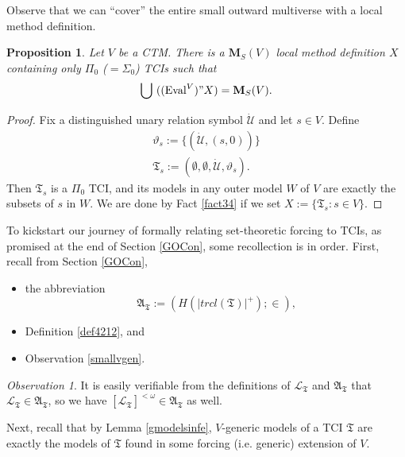 \documentclass[12pt, twoside]{memoir}
\numberwithin{equation}{section}
\newtheorem{prop}[thm]{Proposition}
\theoremstyle{definition}
\theoremstyle{remark}
\newtheorem{ob}[thm]{Observation}
\theoremstyle{definition}
\theoremstyle{definition}
\theoremstyle{definition}
\theoremstyle{remark}
\begin{document}
Observe that we can ``cover'' the entire small outward multiverse with a local method definition.

\begin{prop}\label{prop326}
Let $V$ be a CTM. There is a $\mathbf{M}_S(V)$ local method definition $X$ containing only $\Pi_0$ ($= \Sigma_0$) TCIs such that 
\begin{equation*}
    \bigcup \ ((\mathrm{Eval}^V)" X) = \mathbf{M}_S(V) \text{.}
\end{equation*}
\end{prop}

\begin{proof}
Fix a distinguished unary relation symbol $\dot{\mathcal{U}}$ and let $s \in V$. Define 
\begin{gather*}
    \vartheta_s := \{(\dot{\mathcal{U}}, (s, 0))\} \\
    \mathfrak{T}_s := (\emptyset, \emptyset, \dot{\mathcal{U}}, \vartheta_s) \text{.}
\end{gather*}
Then $\mathfrak{T}_s$ is a $\Pi_0$ TCI, and its models in any outer model $W$ of $V$ are exactly the subsets of $s$ in $W$. We are done by Fact \ref{fact34} if we set $X := \{\mathfrak{T}_s : s \in V\}$.
\end{proof}

To kickstart our journey of formally relating set-theoretic forcing to TCIs, as promised at the end of Section \ref{GOCon}, some recollection is in order. First, recall from Section \ref{GOCon}, 
\begin{itemize}
    \item the abbreviation
    \begin{equation*}
        \mathfrak{A}_{\mathfrak{T}} := (H(|trcl(\mathfrak{T})|^+); \in) \text{,}
    \end{equation*}
    \item Definition \ref{def4212}, and 
    \item Observation \ref{smallvgen}.
\end{itemize}

\begin{ob}\label{ob331}
It is easily verifiable from the definitions of $\mathcal{L}_{\mathfrak{T}}$ and $\mathfrak{A}_{\mathfrak{T}}$ that $\mathcal{L}_{\mathfrak{T}} \in \mathfrak{A}_{\mathfrak{T}}$, so we have $[\mathcal{L}_{\mathfrak{T}}]^{< \omega} \in \mathfrak{A}_{\mathfrak{T}}$ as well.
\end{ob}

Next, recall that by Lemma \ref{gmodelsinfe}, $V$-generic models of a TCI $\mathfrak{T}$ are exactly the models of $\mathfrak{T}$ found in some forcing (i.e. generic) extension of $V$.
\end{document}
